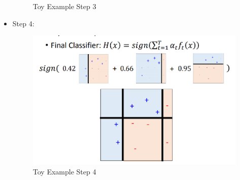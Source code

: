 \begin{itemize}
\begin{figure}[H]
        \caption{Toy Example Step 3}
    \end{figure}
    \item Step 4:
    \\
    \begin{figure}[H]
        \centerline{\includegraphics[scale=0.3]{Part1/Chapter/images/toyexample4.png}}
        \caption{Toy Example Step 4}
    \end{figure}
\end{itemize}
